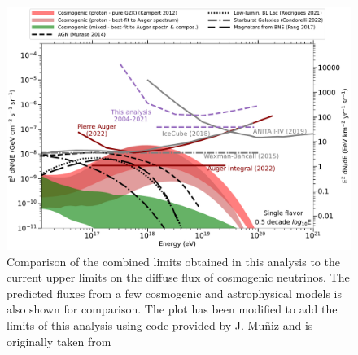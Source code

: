 \begin{figure}[h!]
  \centering
  \includegraphics[width=14.5cm]{thesis_figures/ExpLimits/limits_and_models_DGL.pdf}
  \caption{Comparison of the combined limits obtained in this analysis to the current upper limits on the diffuse flux of cosmogenic neutrinos. The predicted fluxes from a few cosmogenic and astrophysical models is also shown for comparison. The plot has been modified to add the limits of this analysis using code provided by J. Muñiz and is originally taken from ~\cite{PierreAuger:2023pjg}}
  \label{fig:Limit_comp_overall}
\end{figure}



